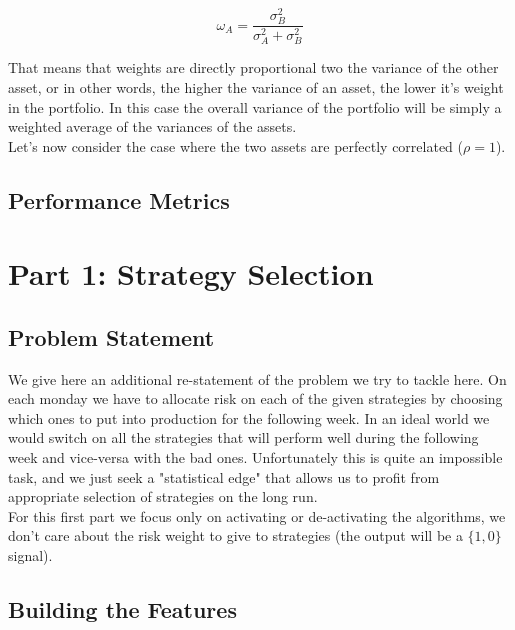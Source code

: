 \documentclass[a4paper]{article}
\numberwithin{equation}{subsection}
\begin{document}
\begin{equation} \label{eq_rho_zero}
\omega_A = \frac{\sigma_B^2}{\sigma_A^2 + \sigma_B^2}
\end{equation}

That means that weights are directly proportional two the variance of the other asset, or in other words, the higher the variance of an asset, the lower it's weight in the portfolio. In this case the overall variance of the portfolio will be simply a weighted average of the variances of the assets.\\

Let's now consider the case where the two assets are perfectly correlated ($\rho = 1$).
 
\subsection{Performance Metrics}



\section{Part 1: Strategy Selection}

\subsection*{Problem Statement}

We give here an additional re-statement of the problem we try to tackle here. On each monday we have to allocate risk on each of the given strategies by choosing which ones to put into production for the following week. In an ideal world we would switch on all the strategies that will perform well during the following week and vice-versa with the bad ones. Unfortunately this is quite an impossible task, and we just seek a "statistical edge" that allows us to profit from appropriate selection of strategies on the long run.\\
For this first part we focus only on activating or de-activating the algorithms, we don't care about the risk weight to give to strategies (the output will be a $\{1,0\}$ signal).

\subsection*{Building the Features}
\end{document}
